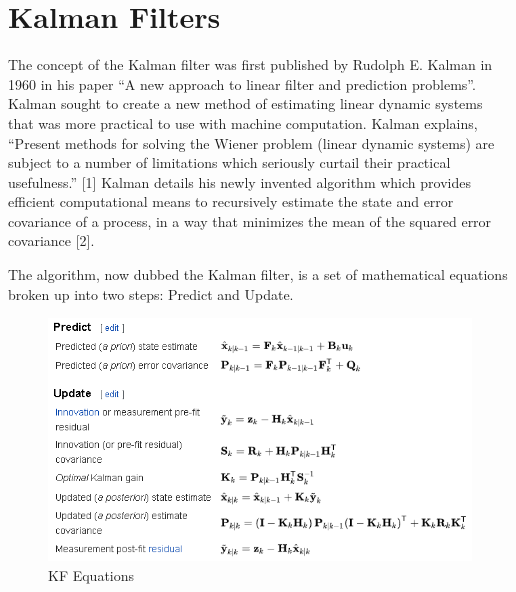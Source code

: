 \section{Kalman Filters}

The concept of the Kalman filter was first published by Rudolph E. Kalman in 1960 in his paper “A new approach to linear filter and prediction problems”. Kalman sought to create a new method of estimating linear dynamic systems that was more practical to use with machine computation. Kalman explains, “Present methods for solving the Wiener problem (linear dynamic systems) are subject to a number of limitations which seriously curtail their practical usefulness.” [1] Kalman details his newly invented algorithm which provides efficient computational means to recursively estimate the state and error covariance of a process, in a way that minimizes the mean of the squared error covariance [2].

The algorithm, now dubbed the Kalman filter, is a set of mathematical equations broken up into two steps: Predict and Update.

\begin{figure}
    \centering
    \includegraphics[width=12cm]{body/background/KFEqu.png}
    \caption{KF Equations}
    \label{fig:my_label}
\end{figure}


